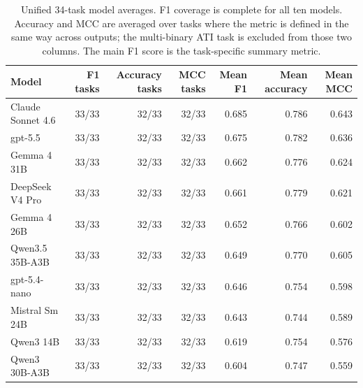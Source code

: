 \begin{table}[H]
\centering
\caption{Unified 34-task model averages. F1 coverage is complete for all ten models. Accuracy and MCC are averaged over tasks where the metric is defined in the same way across outputs; the multi-binary ATI task is excluded from those two columns. The main F1 score is the task-specific summary metric. \label{tab:altmetrics}}
\centering
\fontsize{9}{11}\selectfont
\begin{tabular}[t]{lrrrrrr}
\toprule
Model & F1 tasks & Accuracy tasks & MCC tasks & Mean F1 & Mean accuracy & Mean MCC\\
\midrule
Claude Sonnet 4.6 & 33/33 & 32/33 & 32/33 & 0.685 & 0.786 & 0.643\\
gpt-5.5 & 33/33 & 32/33 & 32/33 & 0.675 & 0.782 & 0.636\\
Gemma 4 31B & 33/33 & 32/33 & 32/33 & 0.662 & 0.776 & 0.624\\
DeepSeek V4 Pro & 33/33 & 32/33 & 32/33 & 0.661 & 0.779 & 0.621\\
Gemma 4 26B & 33/33 & 32/33 & 32/33 & 0.652 & 0.766 & 0.602\\
\addlinespace
Qwen3.5 35B-A3B & 33/33 & 32/33 & 32/33 & 0.649 & 0.770 & 0.605\\
gpt-5.4-nano & 33/33 & 32/33 & 32/33 & 0.646 & 0.754 & 0.598\\
Mistral Sm 24B & 33/33 & 32/33 & 32/33 & 0.643 & 0.744 & 0.589\\
Qwen3 14B & 33/33 & 32/33 & 32/33 & 0.619 & 0.754 & 0.576\\
Qwen3 30B-A3B & 33/33 & 32/33 & 32/33 & 0.604 & 0.747 & 0.559\\
\bottomrule
\end{tabular}
\end{table}

